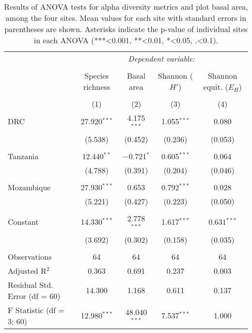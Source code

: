 
\begin{table}[!htbp] \centering 
  	\caption[ANOVA statistics among sites]{Results of ANOVA tests for alpha diversity metrics and plot basal area, among the four sites. Mean values for each site with standard errors in parentheses are shown. Asterisks indicate the p-value of individual sites in each ANOVA (***<0.001, **<0.01, *<0.05, .<0.1).} 
  \label{bicuar:anova_table} 
\begin{tabular}{lcccc} 
 	\hline
 & \multicolumn{4}{c}{\textit{Dependent variable:}} \\ 
\cline{2-5} 
\\[-1.8ex] & Species richness & Basal area & Shannon ($H'$) & Shannon equit. ($E_{H}$) \\ 
\\[-1.8ex] & (1) & (2) & (3) & (4)\\ 
 	\hline
 DRC & 27.920$^{***}$ & 4.175$^{***}$ & 1.055$^{***}$ & 0.080 \\ 
  & (5.538) & (0.452) & (0.236) & (0.053) \\ 
  & & & & \\ 
 Tanzania & 12.440$^{**}$ & $-$0.721$^{*}$ & 0.605$^{***}$ & 0.064 \\ 
  & (4.788) & (0.391) & (0.204) & (0.046) \\ 
  & & & & \\ 
 Mozambique & 27.930$^{***}$ & 0.653 & 0.792$^{***}$ & 0.028 \\ 
  & (5.221) & (0.427) & (0.223) & (0.050) \\ 
  & & & & \\ 
 Constant & 14.330$^{***}$ & 2.778$^{***}$ & 1.617$^{***}$ & 0.631$^{***}$ \\ 
  & (3.692) & (0.302) & (0.158) & (0.035) \\ 
  & & & & \\ 
 	\hline
Observations & 64 & 64 & 64 & 64 \\ 
Adjusted R$^{2}$ & 0.363 & 0.691 & 0.237 & 0.003 \\ 
Residual Std. Error (df = 60) & 14.300 & 1.168 & 0.611 & 0.137 \\ 
F Statistic (df = 3; 60) & 12.980$^{***}$ & 48.040$^{***}$ & 7.537$^{***}$ & 1.000 \\ 
 	\hline
\end{tabular} 
\end{table} 
